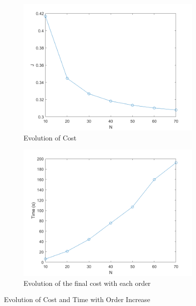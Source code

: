 \begin{figure}[h!]
\centering
\begin{subfigure}[b]{0.5\textwidth}
    \centering
    \includegraphics[width=\textwidth]{Images/results/costevolution.png}
    \caption{Evolution of Cost}
    \label{fig:evolutionofcostprogressiveN}
\end{subfigure}%
\begin{subfigure}[b]{0.5\textwidth}
    \centering
    \includegraphics[width=\textwidth]{Images/results/timeevolutionincreasingN.png}
    \caption{Evolution of the final cost with each order}
    \label{fig:evolutionoftimeprogressiveN}
\end{subfigure}
\caption{Evolution of Cost and Time with Order Increase}
\label{fig:progressiveNinfo}
\end{figure}

